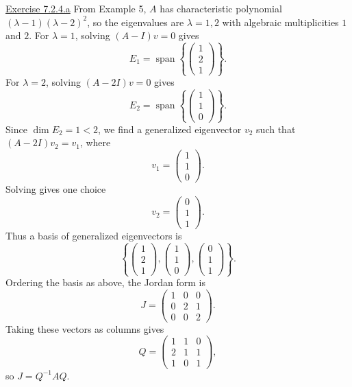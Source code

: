 \documentclass{exam}
\begin{document}
\underline{Exercise 7.2.4.a}
\newline
\newline
From Example 5, $A$ has characteristic polynomial $(\lambda-1)(\lambda-2)^2$, so the eigenvalues are $\lambda=1,2$ with algebraic multiplicities $1$ and $2$. For $\lambda=1$, solving $(A-I)v=0$ gives
\[
E_1=\operatorname{span}\left\{\begin{pmatrix}1\\2\\1\end{pmatrix}\right\}.
\]
For $\lambda=2$, solving $(A-2I)v=0$ gives
\[
E_2=\operatorname{span}\left\{\begin{pmatrix}1\\1\\0\end{pmatrix}\right\}.
\]
Since $\dim E_2=1<2$, we find a generalized eigenvector $v_2$ such that $(A-2I)v_2=v_1$, where
\[
v_1=\begin{pmatrix}1\\1\\0\end{pmatrix}.
\]
Solving gives one choice
\[
v_2=\begin{pmatrix}0\\1\\1\end{pmatrix}.
\]
Thus a basis of generalized eigenvectors is
\[
\left\{
\begin{pmatrix}1\\2\\1\end{pmatrix},
\begin{pmatrix}1\\1\\0\end{pmatrix},
\begin{pmatrix}0\\1\\1\end{pmatrix}
\right\}.
\]
Ordering the basis as above, the Jordan form is
\[
J=\begin{pmatrix}
1&0&0\\
0&2&1\\
0&0&2
\end{pmatrix}.
\]
Taking these vectors as columns gives
\[
Q=\begin{pmatrix}
1&1&0\\
2&1&1\\
1&0&1
\end{pmatrix},
\]
so $J=Q^{-1}AQ$.
\end{document}
